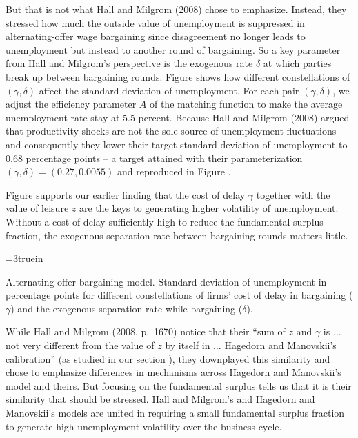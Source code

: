 But that is not what 
Hall and Milgrom (2008) chose to emphasize. Instead, they stressed how much the
outside value of unemployment is suppressed in alternating-offer
wage bargaining since disagreement no longer leads to
unemployment but instead to another round of bargaining. So
a key parameter from Hall and Milgrom's perspective
is the exogenous rate $\delta$ at which parties break up
between bargaining rounds. Figure  shows
how different constellations of $(\gamma, \delta)$ affect the
standard deviation of unemployment.  %
For each pair $(\gamma,\delta)$, we adjust the efficiency
parameter $A$ of the matching function to make the average
unemployment rate stay at 5.5 percent. Because 
Hall and Milgrom (2008) argued that productivity shocks are not
the sole source of unemployment fluctuations and consequently they lower their target  standard deviation
of unemployment to 0.68 percentage points -- a target
attained with their parameterization
$(\gamma, \delta)=(0.27, 0.0055)$
and reproduced in Figure .

Figure  supports our earlier finding
that the cost of delay $\gamma$ together with the value of
leisure $z$ are the keys to  generating higher volatility
of unemployment. Without a cost of delay sufficiently high
to reduce the fundamental surplus fraction, the exogenous separation rate between
bargaining rounds  matters little.

\centerline{\epsfxsize=3truein}
\caption{Alternating-offer bargaining model. Standard deviation of unemployment in percentage
points for different constellations of firms' cost of delay in
bargaining ($\gamma$) and the exogenous separation rate while
bargaining ($\delta$).}
\endfigure

While Hall and Milgrom (2008, p.~1670) notice that their ``sum
of $z$ and $\gamma$ is $\ldots$ not very different from the value
of $z$ by itself in $\ldots$ Hagedorn and Manovskii's
calibration'' (as studied in our section ),
they downplayed this  similarity and chose to emphasize
  differences in mechanisms across Hagedorn and Manovskii's model and theirs.
But   focusing on the  fundamental surplus tells us that it is
their similarity that should
be stressed.   Hall and Milgrom's and Hagedorn and Manovskii's  models are united in requiring a small fundamental
surplus fraction  to generate high unemployment volatility
over the business cycle.




